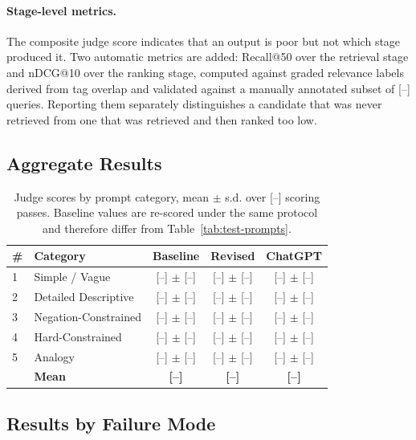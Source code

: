 \paragraph{Stage-level metrics.}
The composite judge score indicates that an output is poor but not which stage
produced it. Two automatic metrics are added: Recall@50 over the retrieval
stage and nDCG@10 over the ranking stage, computed against graded relevance
labels derived from tag overlap and validated against a manually annotated
subset of [--] queries. Reporting them separately distinguishes a candidate that
was never retrieved from one that was retrieved and then ranked too low.

\subsection{Aggregate Results}
\label{sec:post-eval-aggregate}

\begin{table}[h]
\centering
\caption{Judge scores by prompt category, mean $\pm$ s.d. over [--] scoring
passes. Baseline values are re-scored under the same protocol and therefore
differ from Table~\ref{tab:test-prompts}.}
\label{tab:post-eval-scores}
\small
\begin{tabular}{llccc}
\hline
\textbf{\#} & \textbf{Category} & \textbf{Baseline} & \textbf{Revised} & \textbf{ChatGPT} \\
\hline
1 & Simple / Vague       & [--] $\pm$ [--] & [--] $\pm$ [--] & [--] $\pm$ [--] \\
2 & Detailed Descriptive & [--] $\pm$ [--] & [--] $\pm$ [--] & [--] $\pm$ [--] \\
3 & Negation-Constrained & [--] $\pm$ [--] & [--] $\pm$ [--] & [--] $\pm$ [--] \\
4 & Hard-Constrained     & [--] $\pm$ [--] & [--] $\pm$ [--] & [--] $\pm$ [--] \\
5 & Analogy              & [--] $\pm$ [--] & [--] $\pm$ [--] & [--] $\pm$ [--] \\
\hline
  & \textbf{Mean}        & \textbf{[--]}   & \textbf{[--]}   & \textbf{[--]}   \\
\hline
\end{tabular}
\end{table}

\subsection{Results by Failure Mode}
\label{sec:post-eval-failure-modes}


